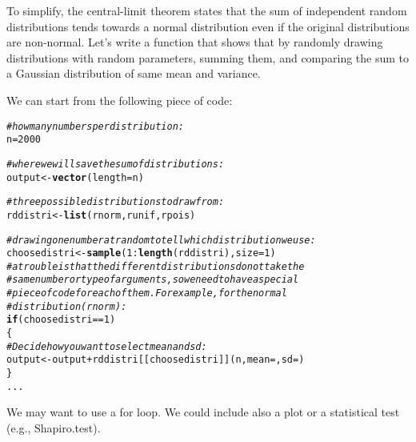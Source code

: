 \documentclass[12pt,a4paper]{scrartcl}\usepackage[]{graphicx}\usepackage[]{color}
\makeatletter
\newcommand{\hlnum}[1]{\textcolor[rgb]{0.686,0.059,0.569}{#1}}%
\newcommand{\hlcom}[1]{\textcolor[rgb]{0.678,0.584,0.686}{\textit{#1}}}%
\newcommand{\hlopt}[1]{\textcolor[rgb]{0,0,0}{#1}}%
\newcommand{\hlstd}[1]{\textcolor[rgb]{0.345,0.345,0.345}{#1}}%
\newcommand{\hlkwa}[1]{\textcolor[rgb]{0.161,0.373,0.58}{\textbf{#1}}}%
\newcommand{\hlkwb}[1]{\textcolor[rgb]{0.69,0.353,0.396}{#1}}%
\newcommand{\hlkwc}[1]{\textcolor[rgb]{0.333,0.667,0.333}{#1}}%
\newcommand{\hlkwd}[1]{\textcolor[rgb]{0.737,0.353,0.396}{\textbf{#1}}}%
\newenvironment{kframe}{%
 \def\at@end@of@kframe{}%
 \ifinner\ifhmode%
  \def\at@end@of@kframe{\end{minipage}}%
  \begin{minipage}{\columnwidth}%
 \fi\fi%
 \def\FrameCommand##1{\hskip\@totalleftmargin \hskip-\fboxsep
 \colorbox{shadecolor}{##1}\hskip-\fboxsep
     \hskip-\linewidth \hskip-\@totalleftmargin \hskip\columnwidth}%
 \MakeFramed {\advance\hsize-\width
   \@totalleftmargin\z@ \linewidth\hsize
   \@setminipage}}%
 {\par\unskip\endMakeFramed%
 \at@end@of@kframe}
\newenvironment{knitrout}{}{} %
\makeatother
\begin{document}
\clearpage

\begin{Exercise}[difficulty=2, title={Recover the central-limit theorem}]
To simplify, the central-limit theorem states that the sum of independent random distributions tends towards a normal distribution even if the original distributions are non-normal.
Let's write a function that shows that by randomly drawing distributions with random parameters, summing them, and comparing the sum to a Gaussian distribution of same mean and variance.

We can start from the following piece of code:
\begin{knitrout}
\color{fgcolor}\begin{kframe}
\begin{alltt}
\hlcom{#how many numbers per distribution:}
\hlstd{n}\hlkwb{=}\hlnum{2000}

\hlcom{# where we will save the sum of distributions:}
\hlstd{output} \hlkwb{<-} \hlkwd{vector}\hlstd{(}\hlkwc{length} \hlstd{= n)}

\hlcom{# three possible distributions to draw from:}
\hlstd{rddistri} \hlkwb{<-} \hlkwd{list}\hlstd{(rnorm,runif,rpois)}

\hlcom{# drawing one number at random to tell which distribution we use:}
\hlstd{choosedistri} \hlkwb{<-} \hlkwd{sample}\hlstd{(}\hlnum{1}\hlopt{:}\hlkwd{length}\hlstd{(rddistri),} \hlkwc{size} \hlstd{=} \hlnum{1}\hlstd{)}
\hlcom{# a trouble is that the different distributions do not take the }
\hlcom{#same number or type of arguments, so we need to have a special}
\hlcom{#piece of code for each of them. For example, for the normal}
\hlcom{#distribution (rnorm):}
\hlkwa{if}\hlstd{(choosedistri}\hlopt{==}\hlnum{1}\hlstd{)}
\hlstd{\{}
    \hlcom{# Decide how you want to select mean and sd:}
     \hlstd{output} \hlkwb{<-} \hlstd{output} \hlopt{+} \hlstd{rddistri[[choosedistri]](n,} \hlkwc{mean}\hlstd{=,} \hlkwc{sd}\hlstd{=)}
\hlstd{\}}
\hlstd{...}
\end{alltt}
\end{kframe}
\end{knitrout}

We may want to use a for loop. We could include also a plot or a statistical test (e.g., Shapiro.test).
\end{Exercise}
\end{document}
